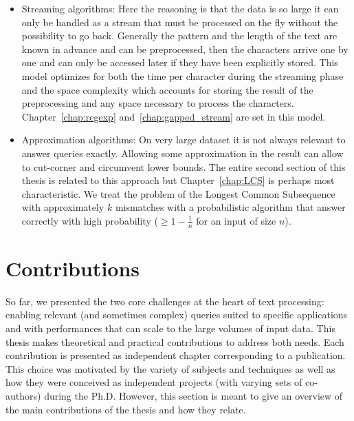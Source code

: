\begin{itemize}
\item Streaming algorithms: Here the reasoning is that the data is so large it can only be handled as a stream that must be processed on the fly without the possibility to go back. Generally the pattern and the length of the text are known in advance and can be preprocessed, then the characters arrive one by one and can only be accessed later if they have been explicitly stored. This model optimizes for both the time per character during the streaming phase and the space complexity which accounts for storing the result of the preprocessing and any space necessary to process the characters. Chapter~\ref{chap:regexp} and~\ref{chap:gapped_stream} are set in this model.
\item Approximation algorithms: On very large dataset it is not always relevant to answer queries exactly. Allowing some approximation in the result can allow to cut-corner and circumvent lower bounds. The entire second section of this thesis is related to this approach but Chapter~\ref{chap:LCS} is perhaps most characteristic. We treat the problem of the Longest Common Subsequence with approximately $k$ mismatches with a probabilistic algorithm that answer correctly with high probability ($\geq 1 - \frac{1}{n}$ for an input of size $n$).
\end{itemize}

\section{Contributions}\label{intro:sec:contrib}

So far, we presented the two core challenges at the heart of text processing: enabling relevant (and sometimes complex) queries suited to specific applications and with performances that can scale to the large volumes of input data.
%
This thesis makes theoretical and practical contributions to address both needs. 
Each contribution is presented as independent chapter corresponding to a publication. This choice was motivated by the variety of subjects and techniques as well as how they were conceived as independent projects (with varying sets of co-authors) during the Ph.D. However, this section is meant to give an overview of the main contributions of the thesis and how they relate.


